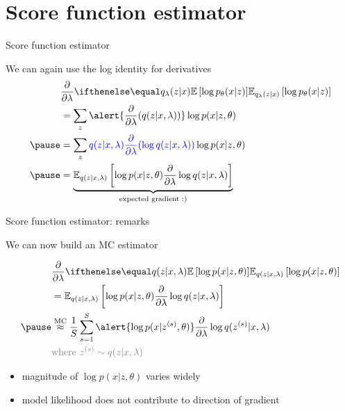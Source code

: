 \section{Score function estimator}

\begin{frame}{Score function estimator}

We can again use the log identity for derivatives
\vspace{-5pt}
\begin{equation*}
\begin{aligned}
&\pdv{\lambda}\E[q_\lambda(z|x)]{\log p_\theta(x|z)} \\ 
&=  \sum_z \alert{\pdv{\lambda}(q(z|x, \lambda))} \log p(x|z, \theta) \\  \pause
&= \sum_z \textcolor{blue}{q(z|x, \lambda) \pdv{\lambda}(\log q(z|x, \lambda))} \log p(x|z, \theta)  \\ \pause
&= \underbrace{\mathbb E_{q(z|x, \lambda)} \left[  \log p(x|z, \theta)  \pdv{\lambda}\log q(z|x, \lambda)\right]}_{\text{expected gradient :)}}
\end{aligned}
\end{equation*}


\end{frame}

\begin{frame}{Score function estimator: remarks}


We can now build an MC estimator
\begin{small}
\begin{equation*}
\begin{aligned}
&\pdv{\lambda}\E[q(z|x,\lambda)]{\log p(x|z,\theta)} \\ 
&= \mathbb E_{q(z|x,\lambda)} \left[  \log p(x|z,\theta)  \pdv{\lambda}\log q(z|x,\lambda)\right] \\ \pause 
&\overset{\text{MC}}{\approx} \frac{1}{S} \sum_{s=1}^S \alert{\log p(x|z^{(s)}, \theta)} \pdv{\lambda}\log q(z^{(s)}|x, \lambda) \\
&\textcolor{gray}{\text{where } z^{(s)} \sim q(z|x, \lambda)}
\end{aligned}
\end{equation*}
\end{small}

\pause
\begin{itemize}
	\item magnitude of $\log p(x|z, \theta)$ varies widely \pause 
	\item model likelihood does not contribute to direction of gradient 
\end{itemize}
\end{frame}


